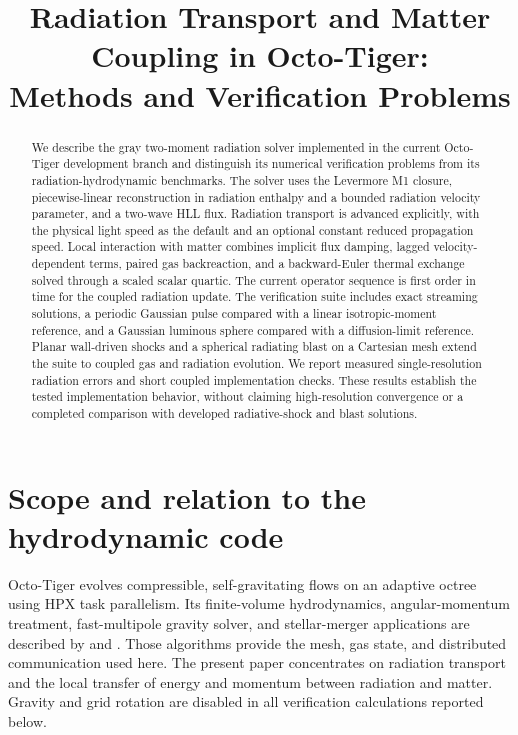 \documentclass[manuscript]{aastex7}
\begin{document}
\title{Radiation Transport and Matter Coupling in Octo-Tiger:\\
Methods and Verification Problems}

\begin{abstract}
We describe the gray two-moment radiation solver implemented in the current
Octo-Tiger development branch and distinguish its numerical verification
problems from its radiation-hydrodynamic benchmarks. The solver uses the
Levermore M1 closure, piecewise-linear reconstruction in radiation enthalpy
and a bounded radiation velocity parameter, and a two-wave HLL flux.
Radiation transport is advanced explicitly, with the physical light speed
as the default and an optional constant reduced propagation speed.
Local interaction with matter combines implicit flux damping, lagged
velocity-dependent terms, paired gas backreaction, and a backward-Euler
thermal exchange solved through a scaled scalar quartic. The current
operator sequence is first order in time for the coupled radiation update.
The verification suite includes exact streaming solutions, a periodic
Gaussian pulse compared with a linear isotropic-moment reference, and a
Gaussian luminous sphere compared with a diffusion-limit reference. Planar
wall-driven shocks and a spherical radiating blast on a Cartesian mesh extend
the suite to coupled gas and radiation evolution. We report measured
single-resolution radiation errors and short coupled implementation checks.
These results establish the tested implementation behavior, without claiming
high-resolution convergence or a completed comparison with developed
radiative-shock and blast solutions.
\end{abstract}

\section{Scope and relation to the hydrodynamic code}
Octo-Tiger evolves compressible, self-gravitating flows on an adaptive octree
using HPX task parallelism. Its finite-volume hydrodynamics, angular-momentum
treatment, fast-multipole gravity solver, and stellar-merger applications are
described by \citet{Marcello2021} and \citet{Shiber2024}. Those algorithms
provide the mesh, gas state, and distributed communication used here. The
present paper concentrates on radiation transport and the local transfer of
energy and momentum between radiation and matter. Gravity and grid rotation
are disabled in all verification calculations reported below.
\end{document}
